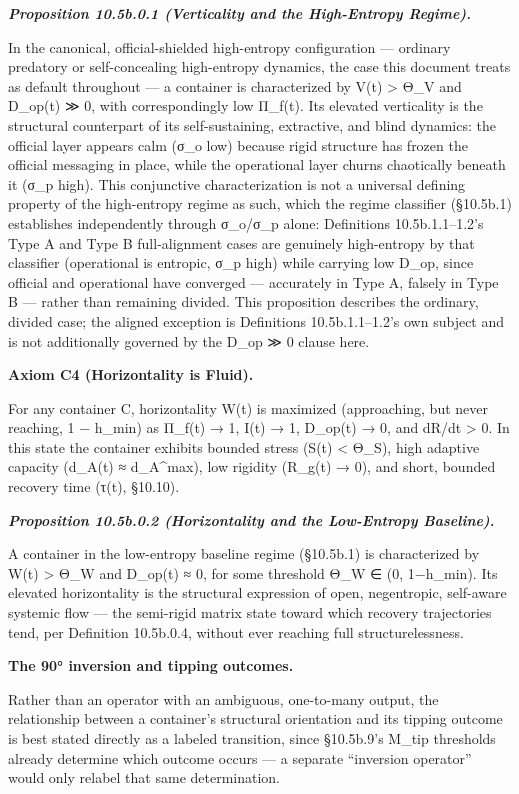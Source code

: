 \documentclass[
]{article}
\begin{document}
\emph{\textbf{Proposition 10.5b.0.1 (Verticality and the High-Entropy
Regime).}}

In the canonical, official-shielded high-entropy configuration ---
ordinary predatory or self-concealing high-entropy dynamics, the case
this document treats as default throughout --- a container is
characterized by V(t) \textgreater{} Θ\_V and D\_op(t) ≫ 0, with
correspondingly low Π\_f(t). Its elevated verticality is the structural
counterpart of its self-sustaining, extractive, and blind dynamics: the
official layer appears calm (σ\_o low) because rigid structure has
frozen the official messaging in place, while the operational layer
churns chaotically beneath it (σ\_p high). This conjunctive
characterization is not a universal defining property of the
high-entropy regime as such, which the regime classifier (§10.5b.1)
establishes independently through σ\_o/σ\_p alone: Definitions
10.5b.1.1--1.2's Type A and Type B full-alignment cases are genuinely
high-entropy by that classifier (operational is entropic, σ\_p high)
while carrying low D\_op, since official and operational have converged
--- accurately in Type A, falsely in Type B --- rather than remaining
divided. This proposition describes the ordinary, divided case; the
aligned exception is Definitions 10.5b.1.1--1.2's own subject and is not
additionally governed by the D\_op ≫ 0 clause here.

\textbf{Axiom C4 (Horizontality is Fluid).}

For any container C, horizontality W(t) is maximized (approaching, but
never reaching, 1 − h\_min) as Π\_f(t) → 1, I(t) → 1, D\_op(t) → 0, and
dR/dt \textgreater{} 0. In this state the container exhibits bounded
stress (S(t) \textless{} Θ\_S), high adaptive capacity (d\_A(t) ≈
d\_A\^{}max), low rigidity (R\_g(t) → 0), and short, bounded recovery
time (τ(t), §10.10).

\emph{\textbf{Proposition 10.5b.0.2 (Horizontality and the Low-Entropy
Baseline).}}

A container in the low-entropy baseline regime (§10.5b.1) is
characterized by W(t) \textgreater{} Θ\_W and D\_op(t) ≈ 0, for some
threshold Θ\_W ∈ (0, 1−h\_min). Its elevated horizontality is the
structural expression of open, negentropic, self-aware systemic flow ---
the semi-rigid matrix state toward which recovery trajectories tend, per
Definition 10.5b.0.4, without ever reaching full structurelessness.

\textbf{The 90° inversion and tipping outcomes.}

Rather than an operator with an ambiguous, one-to-many output, the
relationship between a container's structural orientation and its
tipping outcome is best stated directly as a labeled transition, since
§10.5b.9's M\_tip thresholds already determine which outcome occurs ---
a separate ``inversion operator'' would only relabel that same
determination.
\end{document}
